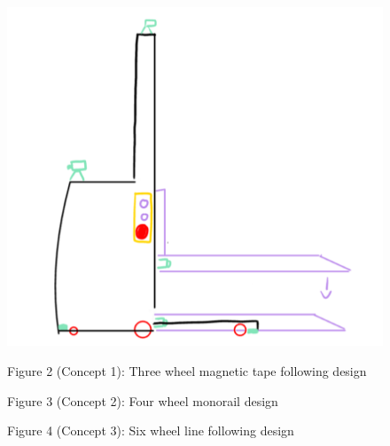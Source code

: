 \documentclass[12pt]{article}
\begin{document}
\begin{figure}[h!]
\begin{minipage}{0.32\textwidth}
    \end{minipage}%
    \hspace{0.01\textwidth}
    \begin{minipage}{0.32\textwidth}
        \centering
        \includegraphics[width=\textwidth]{Louis' design without text.png}
    \end{minipage}
    \hspace{0.01\textwidth}
    
    \vspace{0.5mm}  %
    \begin{minipage}{0.32\textwidth}
        \centering
        \textbf{}Figure 2 (Concept 1): Three wheel magnetic tape following design
    \end{minipage}%
    \hspace{1.5mm} %
    \begin{minipage}{0.32\textwidth}
        \centering
        \textbf{}Figure 3 (Concept 2): Four wheel monorail design 
    \end{minipage}%
    \hspace{1.5mm} %
    \begin{minipage}{0.32\textwidth}
        \centering
        \textbf{}Figure 4 (Concept 3): Six wheel line following design  %
    \end{minipage}
\end{figure}
 
\end{document}
